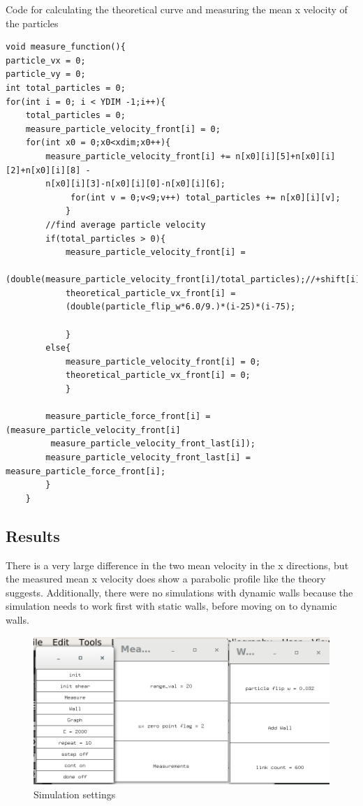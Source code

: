 \documentclass{article}
\begin{document}
Code for calculating the theoretical curve and measuring the mean x velocity of the particles

\vspace{5mm}
\begin{verbatim}
void measure_function(){
particle_vx = 0;
particle_vy = 0;
int total_particles = 0;
for(int i = 0; i < YDIM -1;i++){
	total_particles = 0;
	measure_particle_velocity_front[i] = 0;
	for(int x0 = 0;x0<xdim;x0++){
		measure_particle_velocity_front[i] += n[x0][i][5]+n[x0][i][2]+n[x0][i][8] -
		n[x0][i][3]-n[x0][i][0]-n[x0][i][6];			
			 for(int v = 0;v<9;v++) total_particles += n[x0][i][v];	
			}
		//find average particle velocity
		if(total_particles > 0){
			measure_particle_velocity_front[i] = 
			(double(measure_particle_velocity_front[i]/total_particles);//+shift[i];
			theoretical_particle_vx_front[i] = 	
			(double(particle_flip_w*6.0/9.)*(i-25)*(i-75);

			}
		else{
			measure_particle_velocity_front[i] = 0;
			theoretical_particle_vx_front[i] = 0;
			}
		
		measure_particle_force_front[i] = (measure_particle_velocity_front[i]
		 measure_particle_velocity_front_last[i]);	
		measure_particle_velocity_front_last[i] = measure_particle_force_front[i];
		}
	}

 \end{verbatim}
\vspace{5mm}


\subsection{Results}
There is a very large difference in the two mean velocity in the x directions, but the measured mean x velocity does show a parabolic profile like the theory suggests. Additionally, there were no simulations with dynamic walls because the simulation needs to work first with static walls, before moving on to dynamic walls.

\begin{figure}[H]
\includegraphics[scale=0.35]{A2p1.png}
\caption{\label{fig} Simulation settings}
\end{figure}
\end{document}
